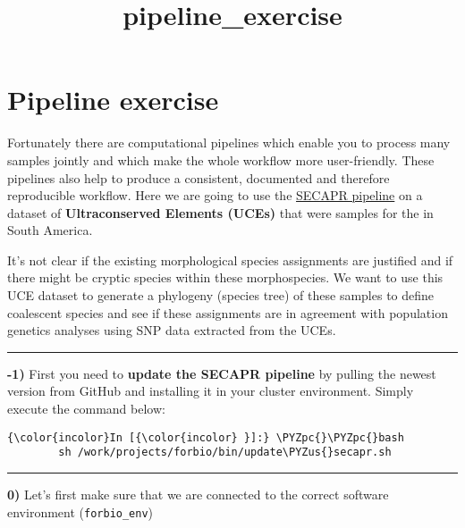 \documentclass[11pt]{article}
\title{pipeline\_exercise}
\def\PYZus{\char`\_}
\def\PYZpc{\char`\%}
\begin{document}
    
    
    \maketitle
    
    

    
    \hypertarget{pipeline-exercise}{%
\section{Pipeline exercise}\label{pipeline-exercise}}

Fortunately there are computational pipelines which enable you to
process many samples jointly and which make the whole workflow more
user-friendly. These pipelines also help to produce a consistent,
documented and therefore reproducible workflow. Here we are going to use
the \href{https://github.com/AntonelliLab/seqcap_processor}{SECAPR
pipeline} on a dataset of \textbf{Ultraconserved Elements (UCEs)} that
were samples for the in South America.

    It's not clear if the existing morphological species assignments are
justified and if there might be cryptic species within these
morphospecies. We want to use this UCE dataset to generate a phylogeny
(species tree) of these samples to define coalescent species and see if
these assignments are in agreement with population genetics analyses
using SNP data extracted from the UCEs.

    \begin{center}\rule{0.5\linewidth}{\linethickness}\end{center}

\textbf{-1)} First you need to \textbf{update the SECAPR pipeline} by
pulling the newest version from GitHub and installing it in your cluster
environment. Simply execute the command below:

    \begin{Verbatim}[commandchars=\\\{\}]
{\color{incolor}In [{\color{incolor} }]:} \PYZpc{}\PYZpc{}bash
        sh /work/projects/forbio/bin/update\PYZus{}secapr.sh
\end{Verbatim}


    \begin{center}\rule{0.5\linewidth}{\linethickness}\end{center}

\textbf{0)} Let's first make sure that we are connected to the correct
software environment (\texttt{forbio\_env})
\end{document}
